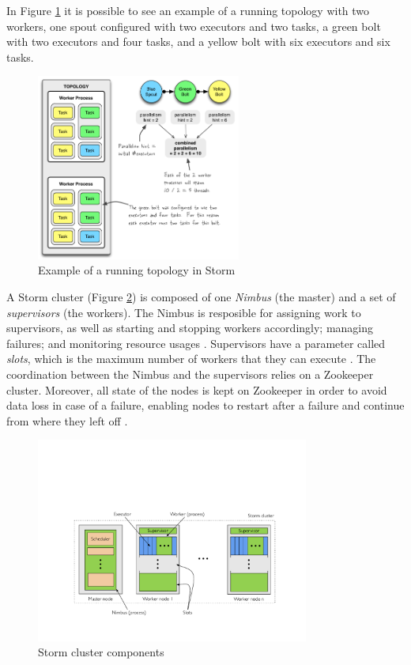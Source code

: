 \documentclass[ppgc,diss,english]{iiufrgs}
\begin{document}
In Figure \ref{fig:storm_running_topology} it is possible to see an example of a running topology with two workers, one spout configured with two executors and two tasks, a green bolt with two executors and four tasks, and a yellow bolt with six executors and six tasks.

\begin{figure}[!ht]
	\centering
	\includegraphics[width=0.6\textwidth]{images/storm/example-of-a-running-topology.png}
	\caption[Example of a running topology in Storm]{Example of a running topology in Storm \cite{storm2015docs}}
	\label{fig:storm_running_topology}
\end{figure}

A Storm cluster (Figure \ref{fig:storm_cluster}) is composed of one \emph{Nimbus} (the master) and a set of \emph{supervisors} (the workers). The Nimbus is resposible for assigning work to supervisors, as well as starting and stopping workers accordingly; managing failures; and monitoring resource usages \cite{heinze2014cloud}. Supervisors have a parameter called \emph{slots}, which is the maximum number of workers that they can execute \cite{aniello2013adaptive}. The coordination between the Nimbus and the supervisors relies on a Zookeeper cluster. Moreover, all state of the nodes is kept on Zookeeper in order to avoid data loss in case of a failure, enabling nodes to restart after a failure and continue from where they left off \cite{storm2015docs}.

\begin{figure}[!ht]
	\centering
	\includegraphics[width=0.8\textwidth]{images/storm/cluster.pdf}
	\caption[Storm cluster components]{Storm cluster components \cite{heinze2014cloud}}
	\label{fig:storm_cluster}
\end{figure}
\end{document}
